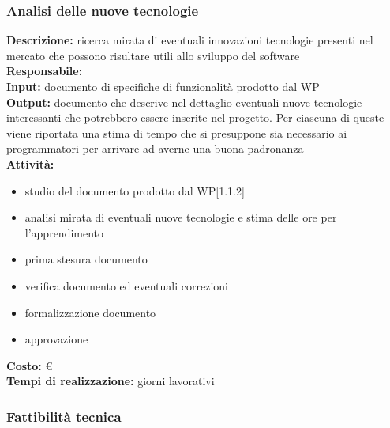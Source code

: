 \subsubsection{Analisi delle nuove tecnologie}
\textbf{Descrizione:} ricerca mirata di eventuali innovazioni tecnologie presenti nel mercato che possono risultare utili allo sviluppo del software\\
\linebreak
\textbf{Responsabile:} \\
\linebreak
\textbf{Input:} documento di specifiche di funzionalità prodotto dal WP\\
\linebreak
\textbf{Output:} documento che descrive nel dettaglio eventuali nuove tecnologie interessanti che potrebbero essere inserite nel progetto. Per ciascuna di queste viene riportata una stima di tempo che si presuppone sia necessario ai programmatori per arrivare ad averne una buona padronanza\\
\linebreak
\textbf{Attività:}
\begin{itemize}
\item studio del documento prodotto dal WP[1.1.2]
\item analisi mirata di eventuali nuove tecnologie e stima delle ore per l'apprendimento
\item prima stesura documento
\item verifica documento ed eventuali correzioni
\item formalizzazione documento
\item approvazione
\end{itemize}

\textbf{Costo:} \euro \\
\textbf{Tempi di realizzazione:}  giorni lavorativi



\subsubsection{Fattibilità tecnica}

